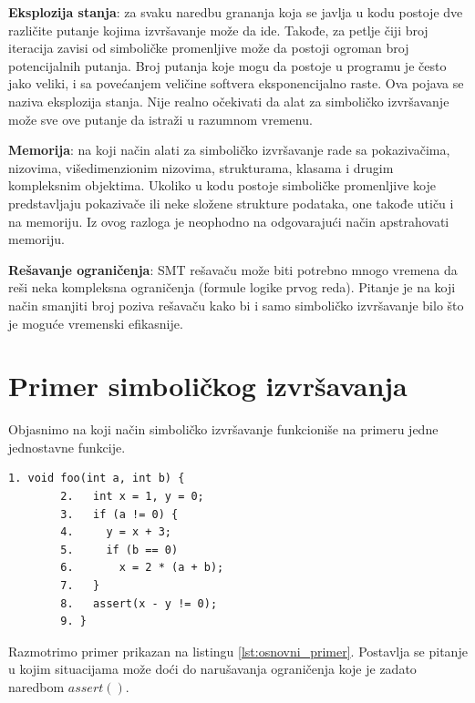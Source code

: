 \documentclass[12pt,oneside]{memoir}
\begin{document}
\begin{description}
    \item \textbf{Eksplozija stanja}: za svaku naredbu grananja koja se javlja u kodu postoje dve različite putanje kojima izvršavanje može da ide. Takođe, za petlje čiji broj iteracija zavisi od simboličke promenljive može da postoji ogroman broj potencijalnih putanja. Broj putanja koje mogu da postoje u programu je često jako veliki, i sa povećanjem veličine softvera eksponencijalno raste. Ova pojava se naziva eksplozija stanja. Nije realno očekivati da alat za simboličko izvršavanje može sve ove putanje da istraži u razumnom vremenu.
    
    \item \textbf{Memorija}: na koji način alati za simboličko izvršavanje rade sa pokazivačima, nizovima, višedimenzionim nizovima, strukturama, klasama i drugim kompleksnim objektima. Ukoliko u kodu postoje simboličke promenljive koje predstavljaju pokazivače ili neke složene strukture podataka, one takođe utiču i na memoriju. Iz ovog razloga je neophodno na odgovarajući način apstrahovati memoriju.

    \item \textbf{Rešavanje ograničenja}: SMT rešavaču može biti potrebno mnogo vremena da reši neka kompleksna ograničenja (formule logike prvog reda). Pitanje je na koji način smanjiti broj poziva rešavaču kako bi i samo simboličko izvršavanje bilo što je moguće vremenski efikasnije.
    
\end{description}

\section{Primer simboličkog izvršavanja}
Objasnimo na koji način simboličko izvršavanje funkcioniše na primeru jedne jednostavne funkcije.

    \begin{lstlisting}[caption={K\^od jednostavne funkcije pomoću koje će biti opisan princip simboličkog izvršavanja},captionpos=b,label={lst:osnovni_primer}]
        1. void foo(int a, int b) {
        2.   int x = 1, y = 0;
        3.   if (a != 0) {
        4.     y = x + 3;
        5.     if (b == 0)
        6.       x = 2 * (a + b);
        7.   }
        8.   assert(x - y != 0);
        9. }
    \end{lstlisting}

\noindent Razmotrimo primer prikazan na listingu \ref{lst:osnovni_primer}. Postavlja se pitanje u kojim situacijama može doći do narušavanja ograničenja koje je zadato naredbom $assert()$. 
\end{document}
